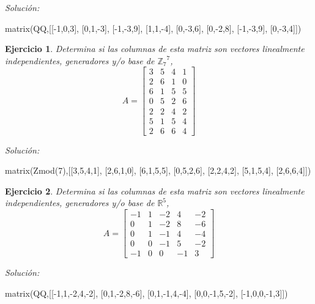 \documentclass{amsart}
\newtheorem{ejer}{Ejercicio}
\begin{document}
{\it Soluci\'on:}

\begin{sageblock}
matrix(QQ,[[-1,0,3],
[0,1,-3],
[-1,-3,9],
[1,1,-4],
[0,-3,6],
[0,-2,8],
[-1,-3,9],
[0,-3,4]])
\end{sageblock}



\begin{ejer} Determina si las columnas de esta matriz son vectores linealmente independientes, generadores y/o base de ${{\mathbb Z}_{7}}^{7}$,
\[ A = \left[\begin{array}{rrrr}
3 & 5 & 4 & 1 \\
2 & 6 & 1 & 0 \\
6 & 1 & 5 & 5 \\
0 & 5 & 2 & 6 \\
2 & 2 & 4 & 2 \\
5 & 1 & 5 & 4 \\
2 & 6 & 6 & 4
\end{array}\right] \]
\end{ejer}

{\it Soluci\'on:}

\begin{sageblock}
matrix(Zmod(7),[[3,5,4,1],
[2,6,1,0],
[6,1,5,5],
[0,5,2,6],
[2,2,4,2],
[5,1,5,4],
[2,6,6,4]])
\end{sageblock}



\begin{ejer} Determina si las columnas de esta matriz son vectores linealmente independientes, generadores y/o base de ${{\mathbb R}}^{5}$,
\[ A = \left[\begin{array}{rrrrr}
-1 & 1 & -2 & 4 & -2 \\
0 & 1 & -2 & 8 & -6 \\
0 & 1 & -1 & 4 & -4 \\
0 & 0 & -1 & 5 & -2 \\
-1 & 0 & 0 & -1 & 3
\end{array}\right] \]
\end{ejer}

{\it Soluci\'on:}

\begin{sageblock}
matrix(QQ,[[-1,1,-2,4,-2],
[0,1,-2,8,-6],
[0,1,-1,4,-4],
[0,0,-1,5,-2],
[-1,0,0,-1,3]])
\end{sageblock}
\end{document}

